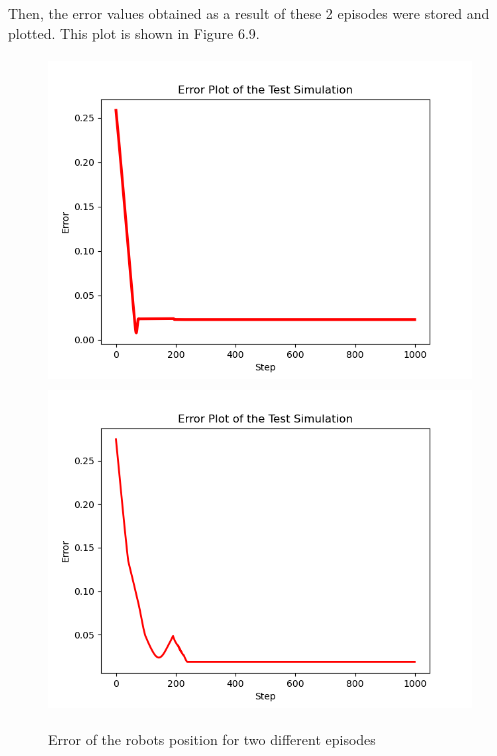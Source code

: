 \documentclass[12pt,twoside,a4]{mwbk}
\begin{document}
\noindent Then, the error values obtained as a result of these 2 episodes were stored and plotted. This plot is shown in Figure 6.9.
\newpage
\begin{figure}[h!]
    \centering
    \includegraphics[width=12.0cm, height=8.6cm]{error_test.png}
    \includegraphics[width=12.0cm, height=8.6cm]{error_test_2.png}
    \caption{Error of the robots position for two different episodes}
\end{figure}
\end{document}

